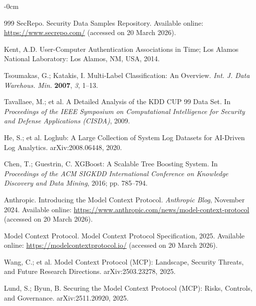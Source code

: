 \documentclass[futureinternet,article,submit,pdftex,moreauthors]{Definitions/mdpi}
\begin{document}
\begin{adjustwidth}{-\extralength}{0cm}
\begin{thebibliography}{999}
SecRepo. Security Data Samples Repository. Available online:
\url{https://www.secrepo.com/} (accessed on 20 March 2026).

Kent, A.D. User-Computer Authentication Associations in Time; Los Alamos National
Laboratory: Los Alamos, NM, USA, 2014.

Tsoumakas, G.; Katakis, I. Multi-Label Classification: An Overview.
\textit{Int. J. Data Warehous. Min.} \textbf{2007}, \textit{3}, 1--13.

Tavallaee, M.; et al. A Detailed Analysis of the KDD CUP 99 Data Set.
In \textit{Proceedings of the IEEE Symposium on Computational Intelligence for Security and
Defense Applications (CISDA)}, 2009.

He, S.; et al. Loghub: A Large Collection of System Log Datasets for AI-Driven Log Analytics.
arXiv:2008.06448, 2020.

Chen, T.; Guestrin, C. XGBoost: A Scalable Tree Boosting System.
In \textit{Proceedings of the ACM SIGKDD International Conference on Knowledge Discovery and
Data Mining}, 2016; pp. 785--794.

Anthropic. Introducing the Model Context Protocol. \textit{Anthropic Blog}, November 2024.
Available online: \url{https://www.anthropic.com/news/model-context-protocol}
(accessed on 20 March 2026).

Model Context Protocol. Model Context Protocol Specification, 2025.
Available online: \url{https://modelcontextprotocol.io/} (accessed on 20 March 2026).

Wang, C.; et al. Model Context Protocol (MCP): Landscape, Security Threats, and Future
Research Directions. arXiv:2503.23278, 2025.

Lund, S.; Byun, B. Securing the Model Context Protocol (MCP): Risks, Controls, and
Governance. arXiv:2511.20920, 2025.

\end{thebibliography}

\PublishersNote{}
\end{adjustwidth}
\end{document}
